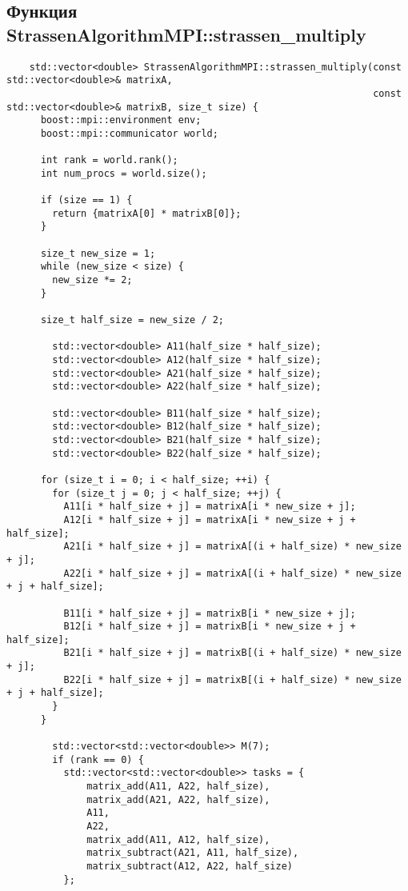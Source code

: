 \documentclass{report}
\begin{document}
\subsection*{Функция StrassenAlgorithmMPI::strassen\_multiply}
\begin{lstlisting}
    std::vector<double> StrassenAlgorithmMPI::strassen_multiply(const std::vector<double>& matrixA,
                                                                const std::vector<double>& matrixB, size_t size) {
      boost::mpi::environment env;
      boost::mpi::communicator world;

      int rank = world.rank();
      int num_procs = world.size();

      if (size == 1) {
        return {matrixA[0] * matrixB[0]};
      }

      size_t new_size = 1;
      while (new_size < size) {
        new_size *= 2;
      }

      size_t half_size = new_size / 2;

        std::vector<double> A11(half_size * half_size);
        std::vector<double> A12(half_size * half_size);
        std::vector<double> A21(half_size * half_size);
        std::vector<double> A22(half_size * half_size);

        std::vector<double> B11(half_size * half_size);
        std::vector<double> B12(half_size * half_size);
        std::vector<double> B21(half_size * half_size);
        std::vector<double> B22(half_size * half_size);

      for (size_t i = 0; i < half_size; ++i) {
        for (size_t j = 0; j < half_size; ++j) {
          A11[i * half_size + j] = matrixA[i * new_size + j];
          A12[i * half_size + j] = matrixA[i * new_size + j + half_size];
          A21[i * half_size + j] = matrixA[(i + half_size) * new_size + j];
          A22[i * half_size + j] = matrixA[(i + half_size) * new_size + j + half_size];

          B11[i * half_size + j] = matrixB[i * new_size + j];
          B12[i * half_size + j] = matrixB[i * new_size + j + half_size];
          B21[i * half_size + j] = matrixB[(i + half_size) * new_size + j];
          B22[i * half_size + j] = matrixB[(i + half_size) * new_size + j + half_size];
        }
      }

        std::vector<std::vector<double>> M(7);
        if (rank == 0) {
          std::vector<std::vector<double>> tasks = {
              matrix_add(A11, A22, half_size),
              matrix_add(A21, A22, half_size),
              A11,
              A22,
              matrix_add(A11, A12, half_size),
              matrix_subtract(A21, A11, half_size),
              matrix_subtract(A12, A22, half_size)
          };


\end{lstlisting}
\end{document}
